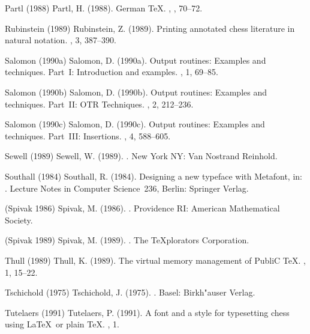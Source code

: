 \item[Partl] Partl (1988)
 Partl, H. (1988).
German \TeX. , , 70--72.

\item[chess] Rubinstein (1989)
 Rubinstein, Z. (1989). Printing annotated chess literature
in natural notation. , 3, 387--390.

\item[Sal1] Salomon (1990a)
 Salomon, D. (1990a). Output routines: Examples and
techniques. Part~I: Introduction and examples.
, 1, 69--85.

\item[Sal2] Salomon (1990b)
 Salomon, D. (1990b). Output routines: Examples and
techniques. Part~II: {\script OTR} Techniques.
, 2, 212--236.

\item[Sal3] Salomon (1990c)
 Salomon, D. (1990c). Output routines: Examples and
techniques. Part~III: Insertions. , 4, 588--605.

\item[Sewell] Sewell (1989)
 Sewell, W. (1989).
.
New York NY: Van Nostrand Reinhold.

\item[S] Southall (1984)
 Southall, R. (1984).
Designing a new typeface with Metafont,
in: .
Lecture Notes in Computer Science~236,
Berlin: Springer Verlag.

\item[Ams] (Spivak 1986)
 Spivak, M. (1986). 
.
Providence RI: American Mathematical Society.

\item[Lams] (Spivak 1989)
 Spivak, M. (1989).
.
The \TeX plorators Corporation.

\item[Thull] Thull (1989)
 Thull, K. (1989). The virtual memory management
of PubliC \TeX. , 1, 15--22.

\item[Tsch] Tschichold (1975)
 Tschichold, J. (1975).
.
Basel: Birkh"auser Verlag.

\item[Tut] Tutelaers (1991)
 Tutelaers, P. (1991).
A font and a style for typesetting chess using \LaTeX\ or plain \TeX.
, 1.


